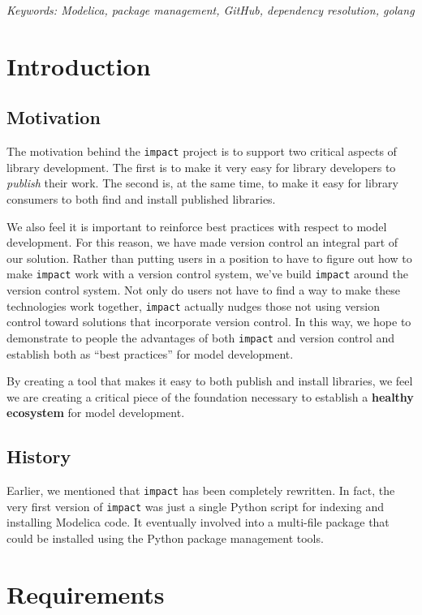 \documentclass[11pt,a4paper,twocolumn]{article}
\newcommand{\code}[1]{\texttt{#1}} %
\begin{document}
\noindent\emph{Keywords: Modelica, package management, GitHub, dependency resolution, golang}

\section{Introduction}

\subsection{Motivation}

The motivation behind the \code{impact} project is to support two
critical aspects of library development.  The first is to make it very
easy for library developers to {\em publish} their work.  The second
is, at the same time, to make it easy for library consumers to both
find and install published libraries.

We also feel it is important  to reinforce best practices with respect
to model development.   For this reason, we have  made version control
an integral  part of  our solution.   Rather than  putting users  in a
position to have  to figure out how to make  \code{impact} work with a
version control  system, we've build \code{impact}  around the version
control system.   Not only  do users not  have to find  a way  to make
these technologies work together,  \code{impact} actually nudges those
not using  version control  toward solutions that  incorporate version
control.  In this way, we hope to demonstrate to people the advantages
of both \code{impact} and version control and establish both as ``best
practices'' for model development.

By creating a tool that makes it easy to both publish and install
libraries, we feel we are creating a critical piece of the foundation
necessary to establish a {\bf healthy ecosystem} for model
development.

\subsection{History}

Earlier, we mentioned that \code{impact} has been completely
rewritten.  In fact, the very first version of \code{impact} was just
a single Python script for indexing and installing Modelica
code\cite{impact-gist}.  It eventually involved into a multi-file
package that could be installed using the Python package management
tools.

\section{Requirements}
\end{document}
